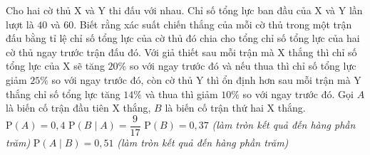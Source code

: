 \begin{ex}%
	Cho hai cờ thủ X và Y thi đấu với nhau. Chỉ số tổng lực ban đầu của X và Y lần lượt là $40$ và $60$. Biết rằng xác suất chiến thắng của mỗi cờ thủ trong một trận đấu bằng tỉ lệ chỉ số tổng lực của cờ thủ đó chia cho tổng chỉ số tổng lực của hai cờ thủ ngay trước trận đấu đó. Với giả thiết sau mỗi trận mà X thắng thì chỉ số tổng lực của X sẽ tăng $20\%$ so với ngay trước đó và nếu thua thì chỉ số tổng lực giảm $25\%$ so với ngay trước đó, còn cờ thủ Y thì ổn định hơn sau mỗi trận mà Y thắng chỉ số tổng lực tăng $14\%$ và thua thì giảm $10\%$ so với ngay trước đó. Gọi $A$ là biến cố trận đầu tiên X thắng, $B$ là biến cố trận thứ hai X thắng.
	\choiceTF
	{\True $\mathrm{P}(A)=0{,}4$}
	{$\mathrm{P}(B\mid A)=\dfrac{9}{17}$}
	{\True $\mathrm{P}(B)=0{,}37$ \textit{(làm tròn kết quả đến hàng phần trăm)}}
	{\True $\mathrm{P}(A\mid B)=0{,}51$ \textit{(làm tròn kết quả đến hàng phần trăm)}}
\end{ex}
